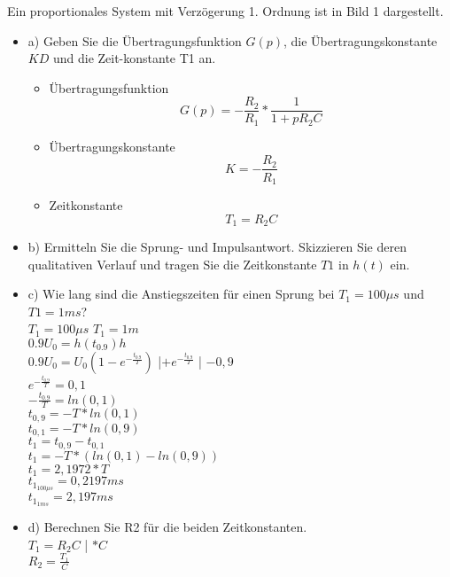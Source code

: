 Ein proportionales System mit Verzögerung 1. Ordnung ist in Bild 1 dargestellt.\\
\begin{itemize}
\item a)    Geben  Sie  die  Übertragungsfunktion  $G(p)$,  die  Übertragungskonstante  $KD$ und die Zeit-konstante T1 an.\\ 
\begin{itemize}
	\item Übertragungsfunktion
		\begin{equation}
			G\left( p \right) = -\frac{ R_{ 2 } }{ R_{ 1 } }*\frac{ 1 }{1+pR_{ 2 }C } 
		\end{equation}
	\item Übertragungskonstante
		\begin{equation}
			K = -\frac{ R_{ 2 } }{ R_{ 1 } }
		\end{equation}
	\item Zeitkonstante
		\begin{equation}
			T_{1} = R_{2}C
		\end{equation}

\end{itemize}

\item b)    Ermitteln  Sie  die  Sprung-  und  Impulsantwort. Skizzieren  Sie  deren  qualitativen  Verlauf und tragen Sie die Zeitkonstante $T1$ in $h(t)$ ein.\\ 
\newline%
\item c)    Wie lang sind die Anstiegszeiten für einen Sprung bei $T_{ 1 }=100\mu s$ und $T1 = 1 ms$?\\ 
\newline
 	$T_{1}=100\mu s$
	$T_{1}=1m $\\
	\newline
	$0.9 U_{0}= h\left( t_{0.9}\right)h$\\
	$0.9 U_{0}= U_{0}\left(1-e^{ -\frac{ t_{ 0.9 } }{T  } }\right)$  |$+e^{ -\frac{ t_{ 0.9 } }{T}}$  | $-0,9$\\
	$e^{ -\frac{ t_{ 0.9 } }{T}} = 0,1$\\
	$-\frac{ t_{ 0.9 } }{T}= ln\left(0,1\right)$\\
	$t_{0,9}= -T*ln(0,1)$\\
	$t_{0,1}= -T*ln(0,9)$\\
	\newline
	$t_{1}=t_{0,9}-t_{0,1}$\\
	$t_{1}=-T*(ln(0,1)-ln(0,9))$\\
	\newline
	\textbf{$t_{1}=2,1972*T$}\\
	\textbf{$t_{1_{100\mu s}}=0,2197ms$}\\
	\textbf{$t_{1_{1ms}}=2,197ms$}\\
	\newline
\item d)    Berechnen Sie R2 für die beiden Zeitkonstanten.\\ 
\newline
$T_{1}=R_{2}C$ | $*C$\\
$R_{2}=\frac{T_{1}}{C}$\\


\end{itemize}

